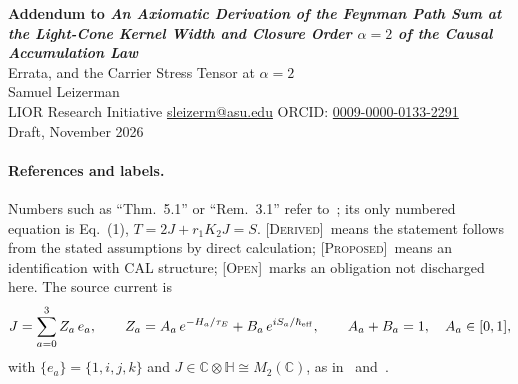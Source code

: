 \documentclass[10pt]{article}
\newcommand{\tr}{\operatorname{tr}}
\theoremstyle{definition}
\newcommand{\Derived}{\textup{\textsc{[Derived]}}\ }
\newcommand{\Proposed}{\textup{\textsc{[Proposed]}}\ }
\newcommand{\Open}{\textup{\textsc{[Open]}}\ }
\begin{document}
\begin{center}
{\large\bfseries Addendum to \emph{An Axiomatic Derivation of the Feynman Path Sum at the Light-Cone Kernel Width and Closure Order $\alpha=2$ of the Causal Accumulation Law}}\\[4pt]
Errata, and the Carrier Stress Tensor at $\alpha=2$\\[6pt]
Samuel Leizerman\\[2pt]
{\small LIOR Research Initiative \quad \href{mailto:sleizerm@asu.edu}{sleizerm@asu.edu} \quad ORCID: \href{https://orcid.org/0009-0000-0133-2291}{0009-0000-0133-2291}}\\[2pt]
{\small Draft, November 2026}
\end{center}

\begin{abstract}
This addendum to~\cite{feyn} does two things. Section~\ref{s:errata} corrects four statements: where the closure's sign acts at $\alpha=2$ (on the phase channel inside each carrier component, not on the memory integral), the status of the order $\alpha=0$ in the Lorentz-invariance theorem (trivial, not a second solution), the word ``retarded'', which becomes ``delayed'', and the reading of ``faithful limit'' in Rem.~7.2. None of the theorems of~\cite[\S\S4--8]{feyn} changes. Section~\ref{s:stress} adds the carrier stress tensor: the Lagrangian $\tr(\partial_\mu J^\dagger\partial^\mu J-\mu^2J^\dagger J)$, whose Euler--Lagrange equation is the off-source field equation of~\cite[Thm.~5.1]{feyn}, gives a symmetric, conserved $T^{\mu\nu}$, proposed as the $\alpha=2$ limit of the matter tensor of the full law. The improvement term is stated and its coefficient is left to the full law. A massive carrier averages to dust ($w=0$), not to a vacuum term, and its tensor is compared with the closure-dyad tensor of the information note.
\end{abstract}

\paragraph{References and labels.} Numbers such as ``Thm.~5.1'' or ``Rem.~3.1'' refer to~\cite{feyn}; its only numbered equation is Eq.~(1), $T=2J+r_1K_2J=S$. \Derived means the statement follows from the stated assumptions by direct calculation; \Proposed means an identification with CAL structure; \Open marks an obligation not discharged here. The source current is
\begin{equation}\label{e:Z}
J=\sum_{a=0}^{3}Z_a\,e_a,\qquad Z_a=A_a\,e^{-H_a/\tau_E}+B_a\,e^{iS_a/\hbar_{\rm eff}},\qquad A_a+B_a=1,\quad A_a\in[0,1],
\end{equation}
with $\{e_a\}=\{1,i,j,k\}$ and $J\in\mathbb C\otimes\mathbb H\cong M_2(\mathbb C)$, as in~\cite[Ax.~1]{feyn} and~\cite[Eq.~(61)]{infonote}.
\end{document}
